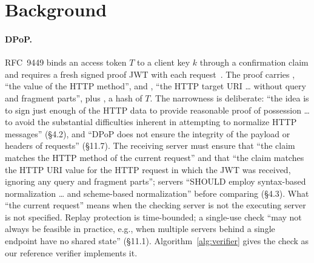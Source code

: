 \section{Background}\label{sec:background}

\paragraph{DPoP.} RFC~9449 binds an access token $T$ to a client key $k$
through a confirmation claim \jkt and requires a fresh signed proof JWT with
each request~\cite{rfc9449}. The proof carries \htm, ``the value of the HTTP
method'', and \htu, ``the HTTP target URI \ldots{} without query and fragment
parts'', plus \ath, a hash of $T$. The narrowness is deliberate: ``the idea is
to sign just enough of the HTTP data to provide reasonable proof of possession
\ldots{} to avoid the substantial difficulties inherent in attempting to
normalize HTTP messages'' (\S4.2), and ``DPoP does not ensure the integrity of
the payload or headers of requests'' (\S11.7). The receiving server must
ensure that ``the \htm claim matches the HTTP method of the current request''
and that ``the \htu claim matches the HTTP URI value for the HTTP request in
which the JWT was received, ignoring any query and fragment parts''; servers
``SHOULD employ syntax-based normalization \ldots{} and scheme-based
normalization'' before comparing (\S4.3). What ``the current request'' means
when the checking server is not the executing server is not specified.
Replay protection is time-bounded; a single-use \jti check ``may not always
be feasible in practice, e.g., when multiple servers behind a single endpoint
have no shared state'' (\S11.1). Algorithm~\ref{alg:verifier} gives the
check as our reference verifier implements it.

